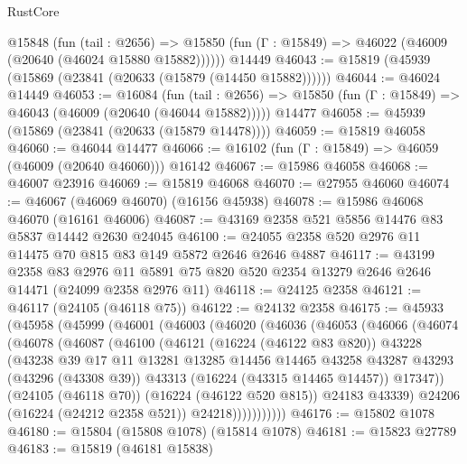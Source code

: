 \begin{lexlean}{RustCore}
\begin{coremodule}
    @15848
      (fun (tail : @2656) =>
      @15850 (fun (Γ : @15849) => @46022 (@46009 (@20640 (@46024 @15880 @15882))))))
    @14449
@46043 := @15819 (@45939 (@15869 (@23841 (@20633 (@15879 (@14450 @15882))))))
@46044 := @46024 @14449
@46053 := @16084
    (fun (tail : @2656) => @15850 (fun (Γ : @15849) => @46043 (@46009 (@20640 (@46044 @15882)))))
    @14477
@46058 := @45939 (@15869 (@23841 (@20633 (@15879 @14478))))
@46059 := @15819 @46058
@46060 := @46044 @14477
@46066 := @16102 (fun (Γ : @15849) => @46059 (@46009 (@20640 @46060))) @16142
@46067 := @15986 @46058
@46068 := @46007 @23916
@46069 := @15819 @46068
@46070 := @27955 @46060
@46074 := @46067 (@46069 @46070) (@16156 @45938)
@46078 := @15986 @46068 @46070 (@16161 @46006)
@46087 := @43169 @2358 @521 @5856 @14476 @83 @5837 @14442 @2630 @24045
@46100 := @24055 @2358 @520 @2976 @11 @14475 @70 @815 @83 @149 @5872 @2646 @2646 @4887
@46117 := @43199
    @2358
    @83
    @2976
    @11
    @5891
    @75
    @820
    @520
    @2354
    @13279
    @2646
    @2646
    @14471
    (@24099 @2358 @2976 @11)
@46118 := @24125 @2358
@46121 := @46117 (@24105 (@46118 @75))
@46122 := @24132 @2358
@46175 := @45933
    (@45958
      (@45999
        (@46001
          (@46003
            (@46020
              (@46036
                (@46053
                  (@46066
                    (@46074
                      (@46078
                        (@46087
                          (@46100
                            (@46121
                              (@16224 (@46122 @83 @820))
                              @43228
                              (@43238
                                @39
                                @17
                                @11
                                @13281
                                @13285
                                @14456
                                @14465
                                @43258
                                @43287
                                @43293
                                (@43296 (@43308 @39))
                                @43313
                                (@16224 (@43315 @14465 @14457))
                                @17347))
                            (@24105 (@46118 @70))
                            (@16224 (@46122 @520 @815))
                            @24183
                            @43339)
                          @24206
                          (@16224 (@24212 @2358 @521))
                          @24218)))))))))))
@46176 := @15802 @1078
@46180 := @15804 (@15808 @1078) (@15814 @1078)
@46181 := @15823 @27789
@46183 := @15819 (@46181 @15838)

\end{coremodule}
\end{lexlean}
